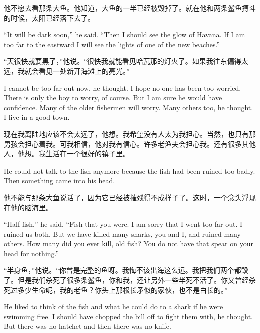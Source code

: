 \begin{paracol}{2}
\switchcolumn

他不愿去看那条大鱼。他知道，大鱼的一半已经被毁掉了。就在他和两条鲨鱼搏斗的时候，太阳已经落下去了。

\switchcolumn*

``It will be dark soon,'' he said. ``Then I should see the glow of Havana.
If I am too far to the eastward I will see the lights of one of the new
beaches.''

\switchcolumn

“天很快就要黑了，”他说。“很快我就能看见哈瓦那的灯火了。如果我往东偏得太远，我就会看见一处新开海滩上的亮光。”

\switchcolumn*

I cannot be too far out now, he thought. I hope no one has been too worried.
There is only the boy to worry, of course. But I am sure he would have
\gls{confidence}. Many of the older fishermen will worry. Many others too,
he thought. I live in a good town.

\switchcolumn

现在我离陆地应该不会太远了，他想。我希望没有人太为我担心。当然，也只有那男孩会担心着我。可我相信，他对我有信心。许多老渔夫会担心我。还有很多其他人，他想。我生活在一个很好的镇子里。

\switchcolumn*

He could not talk to the fish anymore because the fish had been \gls{ruined}
too badly. Then something came into his head.

\switchcolumn

他不能与那条大鱼说话了，因为它已经被摧残得不成样子了。这时，一个念头浮现在他的脑海里。

\switchcolumn*

``Half fish,'' he said. ``Fish that you were. I am sorry that I went too far
out. I ruined us both. But we have killed many sharks, you and I, and ruined
many others. How many did you ever kill, old fish? You do not have that
spear on your head for nothing.''

\switchcolumn

“半身鱼，”他说。“你曾是完整的鱼呀。我悔不该出海这么远。我把我们两个都毁了。但是我们杀死了很多条鲨鱼，你和我，还让另外一些半死不活了。你又曾经杀死过多少生命呢，我的老鱼？你头上那根长矛似的家伙，也不是白长的。”

\switchcolumn*

He liked to think of the fish and what he could do to a shark if he \uline{were}
swimming free. I should have \gls{chopped} the bill off to fight them with,
he thought. But there was no \gls{hatchet} and then there was no knife.


\end{paracol}

